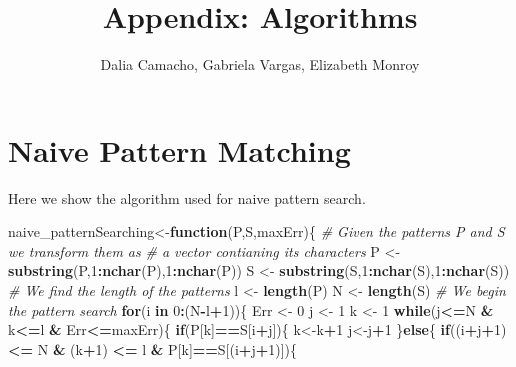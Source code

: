 \documentclass[]{article}
\title{Appendix: Algorithms}
\author{Dalia Camacho, Gabriela Vargas, Elizabeth Monroy}
\date{}
\newenvironment{Shaded}{\begin{snugshade}}{\end{snugshade}}
\newcommand{\KeywordTok}[1]{\textcolor[rgb]{0.13,0.29,0.53}{\textbf{#1}}}
\newcommand{\DecValTok}[1]{\textcolor[rgb]{0.00,0.00,0.81}{#1}}
\newcommand{\StringTok}[1]{\textcolor[rgb]{0.31,0.60,0.02}{#1}}
\newcommand{\CommentTok}[1]{\textcolor[rgb]{0.56,0.35,0.01}{\textit{#1}}}
\newcommand{\ControlFlowTok}[1]{\textcolor[rgb]{0.13,0.29,0.53}{\textbf{#1}}}
\newcommand{\OperatorTok}[1]{\textcolor[rgb]{0.81,0.36,0.00}{\textbf{#1}}}
\newcommand{\NormalTok}[1]{#1}
\begin{document}
\maketitle

\section{Naive Pattern Matching}\label{naive-pattern-matching}

Here we show the algorithm used for naive pattern search.

\begin{Shaded}
\begin{Highlighting}[]
\NormalTok{naive_patternSearching<-}\ControlFlowTok{function}\NormalTok{(P,S,maxErr)\{}
  \CommentTok{# Given the patterns P and S we transform them as}
  \CommentTok{# a vector contianing its characters}
\NormalTok{  P <-}\StringTok{ }\KeywordTok{substring}\NormalTok{(P,}\DecValTok{1}\OperatorTok{:}\KeywordTok{nchar}\NormalTok{(P),}\DecValTok{1}\OperatorTok{:}\KeywordTok{nchar}\NormalTok{(P))}
\NormalTok{  S <-}\StringTok{ }\KeywordTok{substring}\NormalTok{(S,}\DecValTok{1}\OperatorTok{:}\KeywordTok{nchar}\NormalTok{(S),}\DecValTok{1}\OperatorTok{:}\KeywordTok{nchar}\NormalTok{(S))}
  \CommentTok{# We find the length of the patterns}
\NormalTok{  l <-}\StringTok{ }\KeywordTok{length}\NormalTok{(P)}
\NormalTok{  N <-}\StringTok{ }\KeywordTok{length}\NormalTok{(S)}
  \CommentTok{# We begin the pattern search}
  \ControlFlowTok{for}\NormalTok{(i }\ControlFlowTok{in} \DecValTok{0}\OperatorTok{:}\NormalTok{(N}\OperatorTok{-}\NormalTok{l}\OperatorTok{+}\DecValTok{1}\NormalTok{))\{}
\NormalTok{    Err <-}\StringTok{ }\DecValTok{0}
\NormalTok{    j   <-}\StringTok{ }\DecValTok{1}
\NormalTok{    k   <-}\StringTok{ }\DecValTok{1}
    \ControlFlowTok{while}\NormalTok{(j}\OperatorTok{<=}\NormalTok{N }\OperatorTok{&}\StringTok{ }\NormalTok{k}\OperatorTok{<=}\NormalTok{l }\OperatorTok{&}\StringTok{ }\NormalTok{Err}\OperatorTok{<=}\NormalTok{maxErr)\{}
      \ControlFlowTok{if}\NormalTok{(P[k]}\OperatorTok{==}\NormalTok{S[i}\OperatorTok{+}\NormalTok{j])\{}
\NormalTok{        k<-k}\OperatorTok{+}\DecValTok{1}
\NormalTok{        j<-j}\OperatorTok{+}\DecValTok{1}
\NormalTok{      \}}\ControlFlowTok{else}\NormalTok{\{}
        \ControlFlowTok{if}\NormalTok{((i}\OperatorTok{+}\NormalTok{j}\OperatorTok{+}\DecValTok{1}\NormalTok{) }\OperatorTok{<=}\StringTok{ }\NormalTok{N }\OperatorTok{&}\StringTok{ }\NormalTok{(k}\OperatorTok{+}\DecValTok{1}\NormalTok{) }\OperatorTok{<=}\StringTok{ }\NormalTok{l }\OperatorTok{&}\StringTok{ }\NormalTok{P[k]}\OperatorTok{==}\NormalTok{S[(i}\OperatorTok{+}\NormalTok{j}\OperatorTok{+}\DecValTok{1}\NormalTok{)])\{}

\end{Highlighting}
\end{Shaded}
\end{document}
